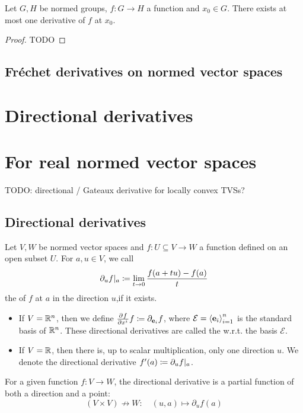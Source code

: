 \begin{proposition}
Let $G, H$ be normed groups, $f:G\to H$ a function and $x_0\in G$. There exists at most one derivative of $f$ at $x_0$.
\end{proposition}
\begin{proof}
TODO
\end{proof}

\subsection{Fréchet derivatives on normed vector spaces}

\section{Directional derivatives}

\section{For real normed vector spaces}
TODO: directional / Gateaux derivative for locally convex TVSs?
\subsection{Directional derivatives}
\begin{definition}
Let $V,W$ be normed vector spaces and $f:U\subseteq V\to W$ a function defined on an open subset $U$. For $a,u\in V$, we call
\[ \partial_u f|_a \coloneqq \lim_{t\to 0} \frac{f(a+tu) - f(a)}{t} \]
the  of $f$ at $a$ in the direction $u$,if it exists.

\begin{itemize}
\item If $V= \mathbb{R}^n$, then we define $ \frac{\partial{^{}}f}{\partial{{x^i}^{}}} f \coloneqq \partial_{\boldsymbol{\mathrm{e}}_i}f$, where $\mathcal{E} = \left\langle \boldsymbol{\mathrm{e}}_i \right\rangle_{i=1}^n$ is the standard basis of $\mathbb{R}^n$. These directional derivatives are called the  w.r.t. the basis $\mathcal{E}$.
\item If $V = \mathbb{R}$, then there is, up to scalar multiplication, only one direction $u$. We denote the directional derivative $f'(a) \coloneqq \partial_u f|_a$.
\end{itemize}
\end{definition}
For a given function $f:V\to W$, the directional derivative is a partial function of both a direction and a point:
\[ (V\times V) \not\to W:\quad (u,a) \mapsto \partial_u f(a)  \]


